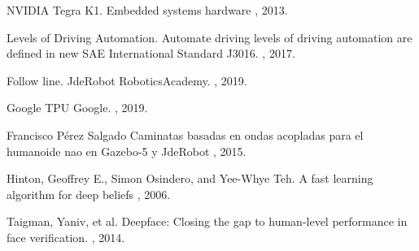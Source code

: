 \begin{thebibliography}{1}
NVIDIA Tegra K1.
\newblock Embedded systems hardware
, 2013.

Levels of Driving Automation.
\newblock Automate driving levels of driving automation are defined in new SAE International Standard J3016.
, 2017.

Follow line.
\newblock JdeRobot RoboticsAcademy.
, 2019.

Google TPU
\newblock Google.
, 2019.

Francisco Pérez Salgado
\newblock Caminatas basadas en ondas acopladas para el humanoide nao en Gazebo-5 y JdeRobot
, 2015.

Hinton, Geoffrey E., Simon Osindero, and Yee-Whye Teh.
\newblock A fast learning algorithm for deep beliefs
, 2006.

Taigman, Yaniv, et al.
\newblock Deepface: Closing the gap to human-level performance in face verification.
, 2014.







\end{thebibliography}
